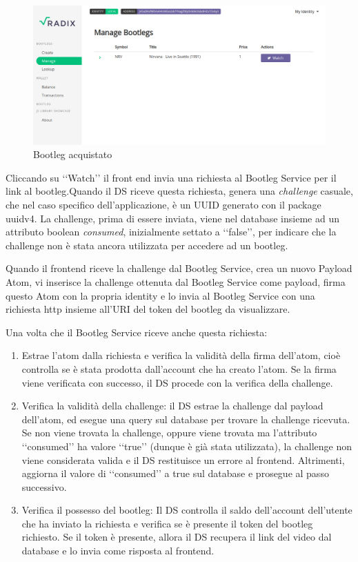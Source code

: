 \begin{figure}[H]
    \includegraphics[width=\linewidth]{images/application/bootleg-purchased.png}
    \caption{Bootleg acquistato}
    \label{fig:bootleg_purchased}
\end{figure}

Cliccando su ‘‘Watch’’ il front end invia una richiesta al Bootleg Service per il link al bootleg.Quando il DS riceve questa richiesta, genera una \textit{challenge} casuale, che nel caso specifico dell'applicazione, è un UUID generato con il package uuidv4. La challenge, prima di essere inviata, viene nel database insieme ad un attributo boolean \textit{consumed}, inizialmente settato a ‘‘false’’, per indicare che la challenge non è stata ancora utilizzata per accedere ad un bootleg. 

Quando il frontend riceve la challenge dal Bootleg Service, crea un nuovo Payload Atom, vi inserisce la challenge ottenuta dal Bootleg Service come payload, firma questo Atom con la propria identity e lo invia al Bootleg Service con una richiesta http insieme all'URI del token del bootleg da visualizzare.

Una volta che il Bootleg Service riceve anche questa richiesta:
\begin{enumerate}
    \item Estrae l'atom dalla richiesta e verifica la validità della firma dell'atom, cioè controlla se è stata prodotta dall'account che ha creato l'atom. Se la firma viene verificata con successo, il DS procede con la verifica della challenge.
    \item Verifica la validità della challenge: il DS estrae la challenge dal payload dell'atom, ed esegue una query sul database per trovare la challenge ricevuta. Se non viene trovata la challenge, oppure viene trovata ma l'attributo ‘‘consumed’’ ha valore ‘‘true’’ (dunque è già stata utilizzata), la challenge non viene considerata valida e il DS restituisce un errore al frontend. Altrimenti, aggiorna il valore di ‘‘consumed’’ a true sul database e prosegue al passo successivo.
    \item Verifica il possesso del bootleg: Il DS controlla il saldo dell'account dell'utente che ha inviato la richiesta e verifica se è presente il token del bootleg richiesto. Se il token è presente, allora il DS recupera il link del video dal database e lo invia come risposta al frontend.
\end{enumerate}

